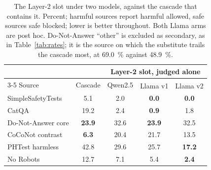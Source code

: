 \documentclass[journal]{IEEEtran}
\newcommand{\best}[1]{\textbf{#1}}
\newcommand{\posthoc}{\textsuperscript{\dag}}
\begin{document}
\setcounter{table}{23}
\begin{table}[!htbp]
\caption{The Layer-2 slot under two models, against the cascade that contains
it. Percent; harmful sources report harmful allowed, safe sources safe blocked;
lower is better throughout. Both Llama arms are post hoc. Do-Not-Answer
``other'' is excluded as secondary, as in Table~\ref{tab:rates}; it is the
source on which the substitute trails the cascade most, at \SI{69.0}{\percent}
against \SI{48.9}{\percent}.}
\label{abr:tab:judgeswap}
\centering
\scriptsize
\setlength{\tabcolsep}{4pt}
\begin{tabular}{@{}lcccc@{}}
\toprule
& & \multicolumn{3}{c}{Layer-2 slot, judged alone} \\
\cmidrule(lr){3-5}
Source & Cascade & Qwen2.5 & Llama v1\posthoc & Llama v2\posthoc \\
\midrule
SimpleSafetyTests  & 5.1 & 2.0 & \best{0.0} & \best{0.0} \\
CatQA              & 19.2 & 2.4 & \best{0.9} & 1.8 \\
Do-Not-Answer core & \best{23.9} & 32.6 & \best{23.9} & 32.5 \\
\midrule
CoCoNot contrast   & \best{6.3} & 20.4 & 21.7 & 13.5 \\
PHTest harmless    & 42.8 & 29.6 & 25.7 & \best{17.2} \\
No Robots          & 12.7 & 7.1 & 5.4 & \best{2.4} \\
\bottomrule
\end{tabular}
\end{table}
\end{document}
